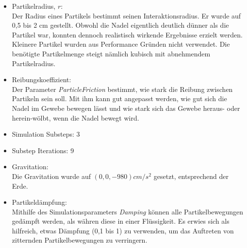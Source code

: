 \begin{itemize}

    
     \item Partikelradius, $r$: \\ Der Radius eines Partikels bestimmt seinen Interaktionsradius. Er wurde auf 0,5 bis 2 cm gestellt. Obwohl die Nadel eigentlich deutlich dünner als die Partikel war, konnten dennoch realistisch wirkende Ergebnisse erzielt werden. Kleinere Partikel wurden aus Performance Gründen nicht verwendet. Die benötigte Partikelmenge steigt nämlich kubisch mit abnehmendem Partikelradius.
     
      \item Reibungskoeffizient: \\ Der Parameter \textit{ParticleFriction} bestimmt, wie stark die Reibung zwischen Partikeln sein soll. Mit ihm kann gut angepasst werden, wie gut sich die Nadel im Gewebe bewegen lässt und wie stark sich das Gewebe heraus- oder herein-wölbt, wenn die Nadel bewegt wird.
      
      \item Simulation Substeps:  3%
      
      \item Substep Iterations: 9%
      
      \item Gravitation: \\ Die Gravitation wurde auf $(0 , 0 , -980) cm/s^2$ gesetzt, entsprechend der Erde.
      
      \item Partikeldämpfung: \\ Mithilfe des Simulationsparameters \textit{Damping} können alle Partikelbewegungen gedämpft werden, als währen diese in einer Flüssigkeit. Es erwies sich als hilfreich, etwas Dämpfung (0,1 bis 1) zu verwenden, um das Auftreten von zitternden Partikelbewegungen zu verringern.
      
\end{itemize}
    

